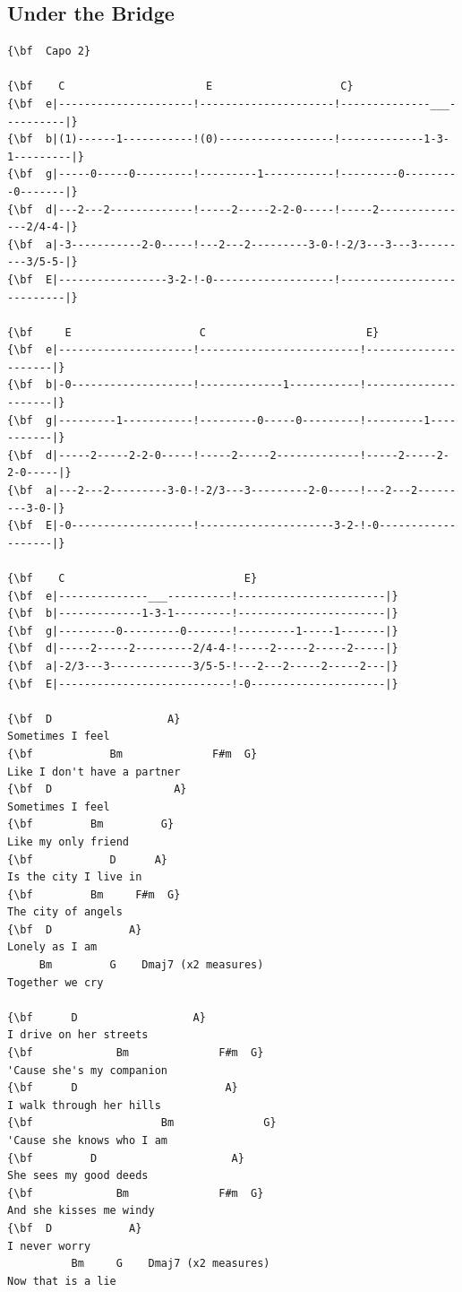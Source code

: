 \documentclass[a4paper]{article}
\begin{document}
\subsection{Under the Bridge}
\begin{Verbatim}[commandchars=\\\{\}]
{\bf  Capo 2}

{\bf    C                      E                    C}
{\bf  e|---------------------!---------------------!--------------___----------|}
{\bf  b|(1)------1-----------!(0)------------------!-------------1-3-1---------|}
{\bf  g|-----0-----0---------!---------1-----------!---------0---------0-------|}
{\bf  d|---2---2-------------!-----2-----2-2-0-----!-----2---------------2/4-4-|}
{\bf  a|-3-----------2-0-----!---2---2---------3-0-!-2/3---3---3---------3/5-5-|}
{\bf  E|-----------------3-2-!-0-------------------!---------------------------|}

{\bf     E                    C                         E}
{\bf  e|---------------------!-------------------------!---------------------|}
{\bf  b|-0-------------------!-------------1-----------!---------------------|}
{\bf  g|---------1-----------!---------0-----0---------!---------1-----------|}
{\bf  d|-----2-----2-2-0-----!-----2-----2-------------!-----2-----2-2-0-----|}
{\bf  a|---2---2---------3-0-!-2/3---3---------2-0-----!---2---2---------3-0-|}
{\bf  E|-0-------------------!---------------------3-2-!-0-------------------|}

{\bf    C                            E}
{\bf  e|--------------___----------!-----------------------|}
{\bf  b|-------------1-3-1---------!-----------------------|}
{\bf  g|---------0---------0-------!---------1-----1-------|}
{\bf  d|-----2-----2---------2/4-4-!-----2-----2-----2-----|}
{\bf  a|-2/3---3-------------3/5-5-!---2---2-----2-----2---|}
{\bf  E|---------------------------!-0---------------------|}

{\bf  D                  A}
Sometimes I feel
{\bf            Bm              F#m  G}
Like I don't have a partner
{\bf  D                   A}
Sometimes I feel
{\bf         Bm         G}
Like my only friend
{\bf            D      A}
Is the city I live in
{\bf         Bm     F#m  G}
The city of angels
{\bf  D            A}
Lonely as I am
     Bm         G    Dmaj7 (x2 measures)
Together we cry

{\bf      D                  A}
I drive on her streets
{\bf             Bm              F#m  G}
'Cause she's my companion
{\bf      D                       A}
I walk through her hills
{\bf                    Bm              G}
'Cause she knows who I am
{\bf         D                     A}
She sees my good deeds
{\bf             Bm              F#m  G}
And she kisses me windy
{\bf  D            A}
I never worry
          Bm     G    Dmaj7 (x2 measures)
Now that is a lie


\end{Verbatim}
\end{document}
